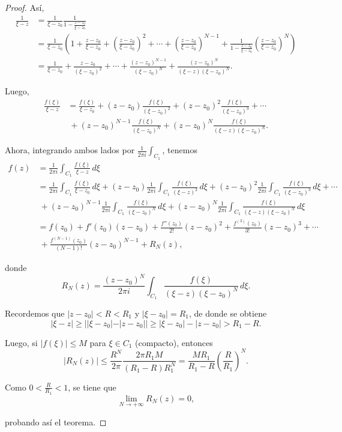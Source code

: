 \begin{proof}
Así,
\begin{align*}
    \frac{1}{\xi-z} &= \frac{1}{\xi-z_0}  \frac{1}{1- \frac{z-z_0}{\xi-z_0}} \\
    &= \frac{1}{\xi-z_0} \left(  1 + \frac{z-z_0}{\xi-z_0} + \left(\frac{z-z_0}{\xi-z_0} \right)^2 + \cdots + \left(\frac{z-z_0}{\xi-z_0} \right)^{N-1} + \frac{1}{1-\frac{z-z_0}{\xi-z_0}} \left(\frac{z-z_0}{\xi-z_0} \right)^{N}\right) \\
    &= \frac{1}{\xi-z_0} + \frac{z-z_0}{(\xi-z_0)^2} + \cdots + \frac{(z-z_0)^{N-1}}{(\xi - z_0)^N} + \frac{(z-z_0)^N}{(\xi-z)(\xi - z_0)^N}.
\end{align*}

Luego,
\begin{align*}
    \frac{f(\xi)}{\xi-z} &= \frac{f(\xi)}{\xi-z_0} +(z-z_0) \frac{f(\xi)}{(\xi-z_0)^2} + (z-z_0)^2 \frac{f(\xi)}{(\xi-z_0)^3} + \cdots \\ & ~ + (z-z_0)^{N-1}\frac{f(\xi)}{(\xi - z_0)^N} +(z-z_0)^N \frac{f(\xi)}{(\xi-z)(\xi - z_0)^N}.
\end{align*}

Ahora, integrando ambos lados por $\frac{1}{2\pi i} \int_{C_1}$, tenemos
\begin{align*}
    f(z) &= \frac{1}{2\pi i} \int_{C_1} \frac{f(\xi)}{\xi-z} \,d\xi \\
    &= \frac{1}{2\pi i} \int_{C_1} \frac{f(\xi)}{\xi-z_0} \,d\xi + (z-z_0) \frac{1}{2\pi i} \int_{C_1} \frac{f(\xi)}{(\xi-z)^2} \,d\xi + (z-z_0)^2 \frac{1}{2\pi i} \int_{C_1} \frac{f(\xi)}{(\xi-z_0)^3} \,d\xi + \cdots \\
    &~+ (z-z_0)^{N-1} \frac{1}{2\pi i} \int_{C_1} \frac{f(\xi)}{(\xi-z_0)^N} \,d\xi + (z-z_0)^N \frac{1}{2\pi i} \int_{C_1} \frac{f(\xi)}{(\xi - z)(\xi - z_0)^N} \,d\xi \\
    &= f(z_0) + f'(z_0) (z-z_0) + \frac{f''(z_0)}{2!}(z-z_0)^2 + \frac{f^{(3)}(z_0)}{3!} (z-z_0)^3 + \cdots \\
    & ~+ \frac{f^{(N-1)}(z_0)}{(N-1)!} (z-z_0)^{N-1} + R_N(z), 
\end{align*}

donde 
$$R_N(z) =  \frac{(z-z_0)^N}{2\pi i} \int_{C_1} \frac{f(\xi)}{(\xi - z)(\xi - z_0)^N} \,d\xi.$$

Recordemos que $ |z-z_0| < R < R_1$ y $|\xi-z_0| = R_1$, de donde se obtiene
$$|\xi-z| \geq ||\xi - z_0| - |z-z_0|| \geq |\xi-z_0| - |z-z_0| > R_1 - R.$$

Luego, si $|f(\xi)| \leq M$ para $\xi \in C_1$ (compacto), entonces
$$|R_N(z)| \leq \frac{R^N}{2\pi} \frac{2\pi R_1 M}{(R_1 - R)R_1^N} = \frac{MR_1}{R_1- R} \left( \frac{R}{R_1}\right)^{N}.$$

Como $0 < \frac{R}{R_1} < 1$, se tiene que
$$\lim_{N \to + \infty} R_N(z) = 0,$$

probando así el teorema.
\end{proof}

